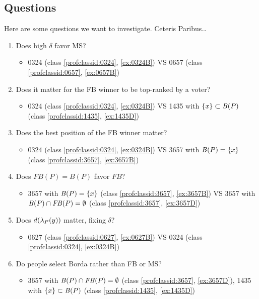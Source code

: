 \documentclass[pagesize, twoside=off, bibliography=totoc, DIV=calc, fontsize=12pt, a4paper]{scrartcl}
\begin{document}
\subsection{Questions}
Here are some questions we want to investigate.
Ceteris Paribus…
\begin{enumerate}
	\item Does high $\delta$ favor MS?
	\begin{itemize}
		\item 0324 (class \ref{profclassid:0324}, \cref{ex:0324B}) VS 0657 (class \ref{profclassid:0657}, \cref{ex:0657B})
	\end{itemize}
	\item Does it matter for the FB winner to be top-ranked by a voter? 
	\begin{itemize}
		\item 0324 (class \ref{profclassid:0324}, \cref{ex:0324B}) VS 1435 with $\{x\} \subset \mathit{B}(P)$ (class \ref{profclassid:1435}, \cref{ex:1435D})
	\end{itemize}
	\item Does the best position of the FB winner matter?
	\begin{itemize}
		\item 0324 (class \ref{profclassid:0324}, \cref{ex:0324B}) VS 3657 with $\mathit{B}(P) = \{x\}$ (class \ref{profclassid:3657}, \cref{ex:3657B})
	\end{itemize}
	\item Does $FB(P) = B(P)$ favor $FB$?
	\begin{itemize}
		\item 3657 with $\mathit{B}(P) = \{x\}$ (class \ref{profclassid:3657}, \cref{ex:3657B}) VS 3657 with $\mathit{B}(P) \cap \mathit{FB}(P) = \emptyset$ (class \ref{profclassid:3657}, \cref{ex:3657D})
	\end{itemize}
	\item Does $d(\lambda_P(y))$ matter, fixing $\delta$?
	\begin{itemize}
		\item 0627 (class \ref{profclassid:0627}, \cref{ex:0627B}) VS 0324 (class \ref{profclassid:0324}, \cref{ex:0324B})
	\end{itemize}
	\item Do people select Borda rather than FB or MS?
	\begin{itemize}
		\item 3657 with $\mathit{B}(P) \cap \mathit{FB}(P) = \emptyset$ (class \ref{profclassid:3657}, \cref{ex:3657D}), 1435 with $\{x\} \subset \mathit{B}(P)$ (class \ref{profclassid:1435}, \cref{ex:1435D})
	\end{itemize}

\end{enumerate}
\end{document}
